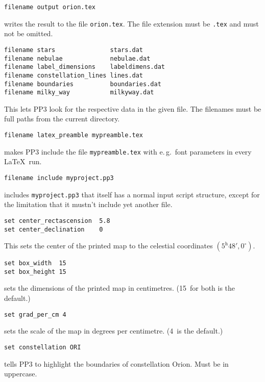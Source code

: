 \documentclass{article}
\newcommand{\PPthree}{\textsf{PP3}\xspace}
\newcommand{\subskip}{\bigskip\medskip}
\newcommand{\subsubskip}{\bigskip}
\begin{document}
\begin{multicols*}{3}
\begin{lstlisting}
filename output orion.tex
\end{lstlisting}
writes the result to the file \verb|orion.tex|.  The file extension must be
\verb|.tex| and must not be omitted.\subsubskip

\begin{lstlisting}
filename stars               stars.dat
filename nebulae             nebulae.dat
filename label_dimensions    labeldimens.dat
filename constellation_lines lines.dat
filename boundaries          boundaries.dat
filename milky_way           milkyway.dat
\end{lstlisting}
This lets \PPthree look for the respective data in the given file.  The
filenames must be full paths from the current directory.\subsubskip

\columnbreak
\begin{lstlisting}
filename latex_preamble mypreamble.tex
\end{lstlisting}
makes \PPthree include the file \verb|mypreamble.tex| with e.\,g.\ font
parameters in every \LaTeX\ run.\subsubskip

\begin{lstlisting}
filename include myproject.pp3
\end{lstlisting}
includes \verb|myproject.pp3| that itself has a normal input script structure,
except for the limitation that it mustn't include yet another file.\subskip

\begin{lstlisting}
set center_rectascension  5.8
set center_declination    0
\end{lstlisting}
This sets the center of the printed map to the celestial coordinates
$(5^{\mathrm h}48',0^\circ)$.\subsubskip

\begin{lstlisting}
set box_width  15
set box_height 15
\end{lstlisting}
sets the dimensions of the printed map in centimetres.  (15~for both is the
default.)\subsubskip

\begin{lstlisting}
set grad_per_cm 4
\end{lstlisting}
sets the scale of the map in degrees per centimetre.  (4~is the default.)\subsubskip

\begin{lstlisting}
set constellation ORI
\end{lstlisting}
tells \PPthree to highlight the boundaries of constellation Orion.  Must be in
uppercase.\subsubskip


\end{multicols*}
\end{document}
